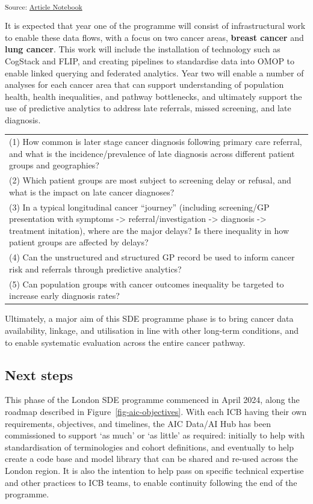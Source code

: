 \documentclass[
  letterpaper,
  DIV=11,
  numbers=noendperiod]{scrartcl}
\begin{document}
\textsubscript{Source:
\href{https://d3london.github.io/sde_aic_docs/index.qmd.html}{Article
Notebook}}

It is expected that year one of the programme will consist of
infrastructural work to enable these data flows, with a focus on two
cancer areas, \textbf{breast cancer} and \textbf{lung cancer}. This work
will include the installation of technology such as CogStack and FLIP,
and creating pipelines to standardise data into OMOP to enable linked
querying and federated analytics. Year two will enable a number of
analyses for each cancer area that can support understanding of
population health, health inequalities, and pathway bottlenecks, and
ultimately support the use of predictive analytics to address late
referrals, missed screening, and late diagnosis.

\begin{longtable}[]{@{}
  >{\raggedright\arraybackslash}p{}@{}}
\toprule\noalign{}
\endhead
\bottomrule\noalign{}
\endlastfoot
(1) How common is later stage cancer diagnosis following primary care
referral, and what is the incidence/prevalence of late diagnosis across
different patient groups and geographies? \\
(2) Which patient groups are most subject to screening delay or refusal,
and what is the impact on late cancer diagnoses? \\
(3) In a typical longitudinal cancer ``journey'' (including screening/GP
presentation with symptoms -\textgreater{} referral/investigation
-\textgreater{} diagnosis -\textgreater{} treatment initation), where
are the major delays? Is there inequality in how patient groups are
affected by delays? \\
(4) Can the unstructured and structured GP record be used to inform
cancer risk and referrals through predictive analytics? \\
(5) Can population groups with cancer outcomes inequality be targeted to
increase early diagnosis rates? \\
\end{longtable}

Ultimately, a major aim of this SDE programme phase is to bring cancer
data availability, linkage, and utilisation in line with other long-term
conditions, and to enable systematic evaluation across the entire cancer
pathway.

\subsection{Next steps}\label{next-steps}

This phase of the London SDE programme commenced in April 2024, along
the roadmap described in Figure~\ref{fig-aic-objectives}. With each ICB
having their own requirements, objectives, and timelines, the AIC
Data/AI Hub has been commissioned to support `as much' or `as little' as
required: initially to help with standardisation of terminologies and
cohort definitions, and eventually to help create a code base and model
library that can be shared and re-used across the London region. It is
also the intention to help pass on specific technical expertise and
other practices to ICB teams, to enable continuity following the end of
the programme.
\end{document}
